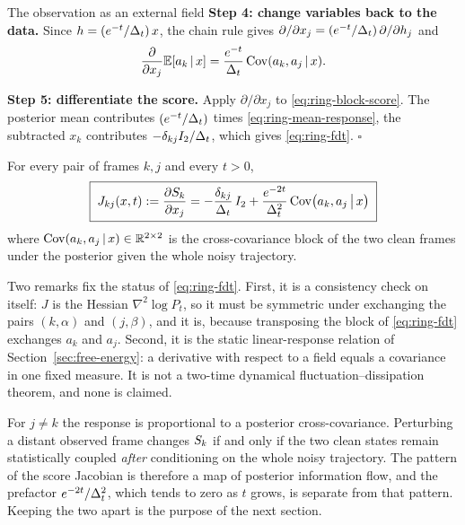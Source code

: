 \begin{toolbox}{The observation as an external field}
\textbf{Step 4: change variables back to the data.} Since
$h = (e^{-t}/\Delta_t)\, x$, the chain rule gives
$\partial/\partial x_j = (e^{-t}/\Delta_t)\,\partial/\partial h_j$ and
\begin{equation}
  \frac{\partial}{\partial x_j}\mathbb{E}[a_k \,|\, x]
  = \frac{e^{-t}}{\Delta_t}\, \mathrm{Cov}(a_k, a_j \,|\, x) .
  \label{eq:ring-mean-response}
\end{equation}

\textbf{Step 5: differentiate the score.} Apply $\partial/\partial x_j$ to
\eqref{eq:ring-block-score}. The posterior mean contributes
$(e^{-t}/\Delta_t)$ times \eqref{eq:ring-mean-response}, the subtracted $x_k$
contributes $-\delta_{kj} I_2 / \Delta_t$, which gives
\eqref{eq:ring-fdt}. \hfill$\square$
\end{toolbox}

\begin{proposition}\label{prop:ring-fdt}
For every pair of frames $k, j$ and every $t > 0$,
\begin{equation}
  \boxed{\;
  J_{kj}(x,t) := \frac{\partial S_k}{\partial x_j}
  = -\frac{\delta_{kj}}{\Delta_t}\, I_2
    + \frac{e^{-2t}}{\Delta_t^2}\,
      \mathrm{Cov}\big(a_k, a_j \,\big|\, x\big) \; }
  \label{eq:ring-fdt}
\end{equation}
where $\mathrm{Cov}(a_k, a_j \,|\, x) \in \mathbb{R}^{2\times2}$ is the
cross-covariance block of the two clean frames under the posterior given the
whole noisy trajectory.
\end{proposition}

Two remarks fix the status of \eqref{eq:ring-fdt}. First, it is a consistency
check on itself: $J$ is the Hessian $\nabla^2 \log P_t$, so it must be
symmetric under exchanging the pairs $(k,\alpha)$ and $(j,\beta)$, and it is,
because transposing the block of \eqref{eq:ring-fdt} exchanges $a_k$ and $a_j$.
Second, it is the static linear-response relation of
Section~\ref{sec:free-energy}: a derivative with respect to a field equals a
covariance in one fixed measure. It is not a two-time dynamical
fluctuation--dissipation theorem, and none is claimed.

For $j \ne k$ the response is proportional to a posterior cross-covariance.
Perturbing a distant observed frame changes $S_k$ if and only if the two
clean states remain statistically coupled \emph{after} conditioning on the
whole noisy trajectory. The pattern of the score Jacobian is therefore a map of
posterior information flow, and the prefactor $e^{-2t}/\Delta_t^2$, which tends
to zero as $t$ grows, is separate from that pattern. Keeping the two apart is
the purpose of the next section.

